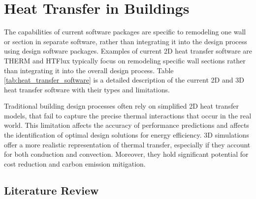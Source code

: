 \chapter{Heat Transfer in Buildings}



The capabilities of current software packages are specific to remodeling one wall or section in separate software, rather than integrating it into the design process using design software packages. Examples of current 2D heat transfer software are THERM and HTFlux typically focus on remodeling specific wall sections 
 rather than integrating it into the overall design process. Table \ref{tab:heat_transfer_software} is a detailed description of the current 2D and 3D heat transfer software with their types and limitations. 

Traditional building design processes often rely on simplified 2D heat transfer models, that fail to capture the precise thermal interactions that occur in the real world. This limitation affects the accuracy of performance predictions and affects the identification of optimal design solutions for energy efficiency. 
3D simulations offer a more realistic representation of thermal transfer, especially if they account for both conduction and convection. 
Moreover, they hold significant potential for cost reduction and carbon emission mitigation. 






\section{Literature Review}






